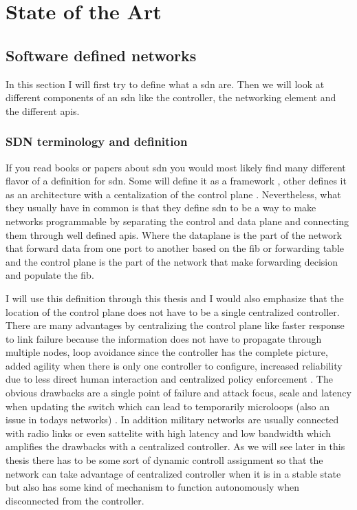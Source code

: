 \chapter{State of the Art}
\section{Software defined networks}
In this section I will first try to define what a \gls{sdn} are. Then we will look at different components of an \gls{sdn} like the controller, the networking element and the different \gls{api}s.
\subsection{SDN terminology and definition}
\label{sec:sdn_definition}
If you read books or papers about \gls{sdn} you would most likely find many different flavor of a definition for \gls{sdn}. Some will define it as a framework \cite{SDN_Anatomy_of_OpenFlow}, other defines it as an architecture with a centalization of the control plane \cite{SDN_Comprehensive} \cite{foundations_2015}. Nevertheless, what they usually have in common is that they define \gls{sdn} to be a way to make networks programmable by separating the control and data plane and connecting them through well defined \gls{api}s\cite{SDN_Anatomy_of_OpenFlow}. Where the dataplane is the part of the network that forward data from one port to another based on the \gls{fib} or forwarding table and the control plane is the part of the network that make forwarding decision and populate the \gls{fib}. 
\par
I will use this definition through this thesis and I would also emphasize that the location of the control plane does not have to be a single centralized controller. There are many advantages by centralizing the control plane like faster response to link failure because the information does not have to propagate through multiple nodes, loop avoidance since the controller has the complete picture, added agility when there is only one controller to configure, increased reliability due to less direct human interaction and centralized policy enforcement \cite{SDN_Anatomy_of_OpenFlow}. The obvious drawbacks are a single point of failure and attack focus, scale and latency when updating the switch which can lead to temporarily microloops (also an issue in todays networks) \cite{SDN_Anatomy_of_OpenFlow}  \cite{SDN_Comprehensive, p 48}. In addition military networks are usually connected with radio links or even sattelite with high latency and low bandwidth which amplifies the drawbacks with a centralized controller. As we will see later in this thesis there has to be some sort of dynamic controll assignment so that the network can take advantage of centralized controller when it is in a stable state but also has some kind of mechanism to function autonomously when disconnected from the controller. 
